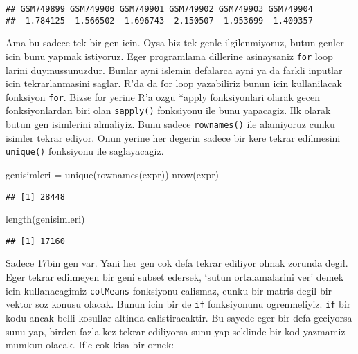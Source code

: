 \documentclass[
]{book}
\newenvironment{Shaded}{\begin{snugshade}}{\end{snugshade}}
\newcommand{\FunctionTok}[1]{\textcolor[rgb]{0.00,0.00,0.00}{#1}}
\newcommand{\NormalTok}[1]{#1}
\newcommand{\OtherTok}[1]{\textcolor[rgb]{0.56,0.35,0.01}{#1}}
\begin{document}
\begin{verbatim}
## GSM749899 GSM749900 GSM749901 GSM749902 GSM749903 GSM749904 
##  1.784125  1.566502  1.696743  2.150507  1.953699  1.409357
\end{verbatim}

Ama bu sadece tek bir gen icin. Oysa biz tek genle ilgilenmiyoruz, butun genler icin bunu yapmak istiyoruz. Eger programlama dillerine asinaysaniz \texttt{for} loop larini duymussunuzdur. Bunlar ayni islemin defalarca ayni ya da farkli inputlar icin tekrarlanmasini saglar. R'da da for loop yazabiliriz bunun icin kullanilacak fonksiyon \texttt{for}. Bizse for yerine R'a ozgu *apply fonksiyonlari olarak gecen fonksiyonlardan biri olan \texttt{sapply()} fonksiyonu ile bunu yapacagiz. Ilk olarak butun gen isimlerini almaliyiz. Bunu sadece \texttt{rownames()} ile alamiyoruz cunku isimler tekrar ediyor. Onun yerine her degerin sadece bir kere tekrar edilmesini \texttt{unique()} fonksiyonu ile saglayacagiz.

\begin{Shaded}
\begin{Highlighting}[]
\NormalTok{genisimleri }\OtherTok{=} \FunctionTok{unique}\NormalTok{(}\FunctionTok{rownames}\NormalTok{(expr))}
\FunctionTok{nrow}\NormalTok{(expr)}
\end{Highlighting}
\end{Shaded}

\begin{verbatim}
## [1] 28448
\end{verbatim}

\begin{Shaded}
\begin{Highlighting}[]
\FunctionTok{length}\NormalTok{(genisimleri)}
\end{Highlighting}
\end{Shaded}

\begin{verbatim}
## [1] 17160
\end{verbatim}

Sadece 17bin gen var. Yani her gen cok defa tekrar ediliyor olmak zorunda degil. Eger tekrar edilmeyen bir geni subset edersek, `sutun ortalamalarini ver' demek icin kullanacagimiz \texttt{colMeans} fonksiyonu calismaz, cunku bir matris degil bir vektor soz konusu olacak. Bunun icin bir de \texttt{if} fonksiyonunu ogrenmeliyiz. \texttt{if} bir kodu ancak belli kosullar altinda calistiracaktir. Bu sayede eger bir defa geciyorsa sunu yap, birden fazla kez tekrar ediliyorsa sunu yap seklinde bir kod yazmamiz mumkun olacak. If'e cok kisa bir ornek:
\end{document}
